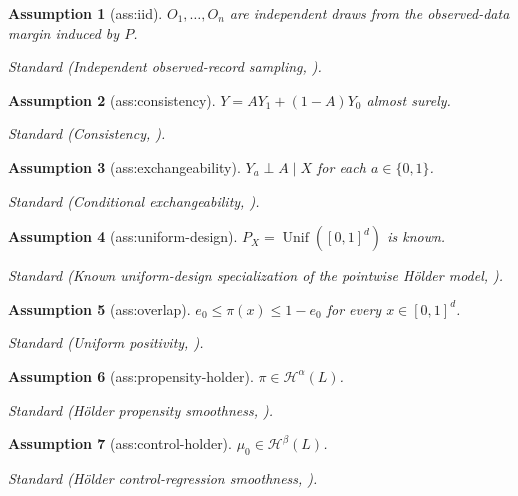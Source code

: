 \documentclass{article}
\newtheorem{assumption}{Assumption}
\begin{document}
\begin{assumption}[ass:iid]\label{ass:iid}
\(O_1,\ldots,O_n\) are independent draws from the observed-data margin induced by \(P\).
\par\smallskip\noindent\emph{Standard} (Independent observed-record sampling, \cite{KennedyBalakrishnanRobinsWasserman2024}).
\end{assumption}

\begin{assumption}[ass:consistency]\label{ass:consistency}
\(Y=AY_1+(1-A)Y_0\) almost surely.
\par\smallskip\noindent\emph{Standard} (Consistency, \cite{KennedyBalakrishnanRobinsWasserman2024}).
\end{assumption}

\begin{assumption}[ass:exchangeability]\label{ass:exchangeability}
\(Y_a\perp A\mid X\) for each \(a\in\{0,1\}\).
\par\smallskip\noindent\emph{Standard} (Conditional exchangeability, \cite{KennedyBalakrishnanRobinsWasserman2024}).
\end{assumption}

\begin{assumption}[ass:uniform-design]\label{ass:uniform-design}
\(P_X=\operatorname{Unif}([0,1]^d)\) is known.
\par\smallskip\noindent\emph{Standard} (Known uniform-design specialization of the pointwise Hölder model, \cite{KennedyBalakrishnanRobinsWasserman2024}).
\end{assumption}

\begin{assumption}[ass:overlap]\label{ass:overlap}
\(e_0\le\pi(x)\le1-e_0\) for every \(x\in[0,1]^d\).
\par\smallskip\noindent\emph{Standard} (Uniform positivity, \cite{KennedyBalakrishnanRobinsWasserman2024}).
\end{assumption}

\begin{assumption}[ass:propensity-holder]\label{ass:propensity-holder}
\(\pi\in\mathcal H^\alpha(L)\).
\par\smallskip\noindent\emph{Standard} (Hölder propensity smoothness, \cite{KennedyBalakrishnanRobinsWasserman2024}).
\end{assumption}

\begin{assumption}[ass:control-holder]\label{ass:control-holder}
\(\mu_0\in\mathcal H^\beta(L)\).
\par\smallskip\noindent\emph{Standard} (Hölder control-regression smoothness, \cite{KennedyBalakrishnanRobinsWasserman2024}).
\end{assumption}
\end{document}
